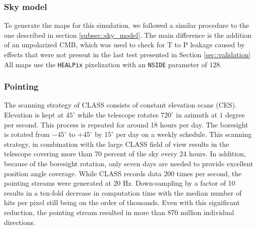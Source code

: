 \documentclass[a4paper,11pt]{article}
\begin{document}
\subsubsection{Sky model}

To generate the maps for this simulation, we followed a similar procedure to the one described in section \ref{subsec::sky_model}. The main difference is the addition of an unpolarized CMB, which was used to check for T to P leakage caused by effects that were not present in the last test presented in Section \ref{sec::validation} All maps use the \texttt{HEALPix} pixelization with an \texttt{NSIDE} parameter of $128$. 

\subsubsection{Pointing}

The scanning strategy of CLASS consists of constant elevation scans (CES). Elevation is kept at $45^{\circ}$ while the telescope rotates $720^\circ$ in azimuth at $1$ degree per second. This process is repeated for around 18 hours per day. The boresight is rotated from $-45^{\circ}$ to $+45^{\circ}$ by $15^{\circ}$ per day on a weekly schedule. This scanning strategy, in combination with the large CLASS field of view results in the telescope covering more than 70 percent of the sky every 24 hours. In addition, because of the boresight rotation, only seven days are needed to provide excellent position angle coverage. While CLASS records data $200$ times per second, the pointing streams were generated at $20$ Hz. Down-sampling by a factor of 10 results in a ten-fold decrease in computation time with the median number of hits per pixel still being on the order of thousands. Even with this significant reduction, the pointing stream resulted in more than 870 million individual directions. 

\end{document}
